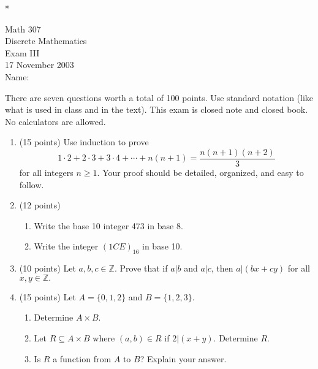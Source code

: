 \documentclass{amsart}
\newcommand{\z}{\mathbb{Z}}
\begin{document}
* \vfill
\Large{
\begin{center}Math 307\\
Discrete Mathematics\\
Exam III\\
17 November 2003\\
\vspace{1in} Name:{\underline{\hspace{2in}}}\\\end{center}

\vspace{1in} There are seven questions worth a total of 100 points.
Use standard notation (like what is used in class and in the text).
This exam is closed note and closed book. No calculators are
allowed.

\vfill *

\newpage

\begin{enumerate}

\item (15 points) Use induction to prove $$ 1 \cdot 2 + 2 \cdot 3 +
3 \cdot 4 + \cdots + n(n+1)=\frac{n(n+1)(n+2)}{3}$$ for all integers
$n \geq 1.$ Your proof should be detailed, organized, and easy to
follow.
\newpage

\item (12 points) \begin{enumerate}
\item Write the base 10 integer 473 in base 8.
\vfill
\item Write the integer $(1CE)_{16}$ in base 10. \vfill
\end{enumerate}

\item (10 points) Let $a,b,c \in \z.$ Prove that if $a|b$ and $a|c$, then $a|(bx+cy)$ for
all $x,y \in \z.$ \vspace{2in}

\item (15 points) Let $A=\{0,1,2\}$ and $B=\{1,2,3\}.$
\begin{enumerate}\item Determine $A \times B.$ \vfill
\item Let $R \subseteq A \times B$ where $(a,b) \in R$ if $2|(x+y).$
Determine $R.$ \vfill
\item Is $R$ a function from $A$ to $B$? Explain your answer. \vfill
\end{enumerate} \newpage


\end{enumerate}}
\end{document}
